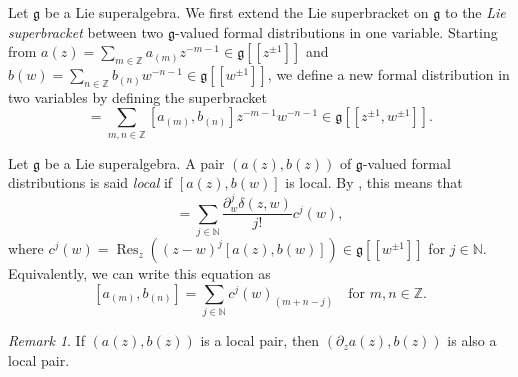 \documentclass[a4paper, 12pt, reqno]{amsart}
\theoremstyle{remark}
\newtheorem{remark}[theorem]{Remark}
\numberwithin{equation}{subsection}
\DeclareMathOperator{\Res}{Res}
\begin{document}
Let $\mathfrak{g}$ be a Lie superalgebra.
We first extend the Lie superbracket on $\mathfrak{g}$ to the \emph{Lie superbracket} between two $\mathfrak{g}$-valued formal distributions in one variable.
Starting from $a(z) = \sum_{m \in \mathbb{Z}}a_{(m)}z^{-m - 1} \in \mathfrak{g}[[z^{\pm 1}]]$ and $b(w) = \sum_{n \in \mathbb{Z}}b_{(n)}w^{-n - 1} \in \mathfrak{g}[[w^{\pm 1}]]$, we define a new formal distribution in two variables by defining the superbracket
\begin{equation*}
  [a(z), b(w)] = \sum_{m, n \in \mathbb{Z}}[a_{(m)}, b_{(n)}]z^{-m - 1}w^{-n - 1} \in \mathfrak{g}[[z^{\pm 1}, w^{\pm 1}]].
\end{equation*}

Let $\mathfrak{g}$ be a Lie superalgebra.
A pair $(a(z), b(z))$ of $\mathfrak{g}$-valued formal distributions is said \emph{local} if $[a(z), b(w)]$ is local.
By , this means that
\begin{equation*}
  [a(z), b(w)] = \sum_{j \in \mathbb{N}}\frac{\partial^j_w\delta(z, w)}{j!}c^j(w),
\end{equation*}
where $c^j(w) = \Res_z((z - w)^j[a(z), b(w)]) \in \mathfrak{g}[[w^{\pm 1}]]$ for $j \in \mathbb{N}$.
Equivalently, we can write this equation as
\begin{equation}
  \label{eq:1}
  [a_{(m)}, b_{(n)}] = \sum_{j \in \mathbb{N}}c^j(w)_{(m + n - j)} \quad \text{for }m, n \in \mathbb{Z}.
\end{equation}

\begin{remark}
  \label{rmk:4}
  If $(a(z), b(z))$ is a local pair, then $(\partial_za(z), b(z))$ is also a local pair.
\end{remark}
\end{document}
